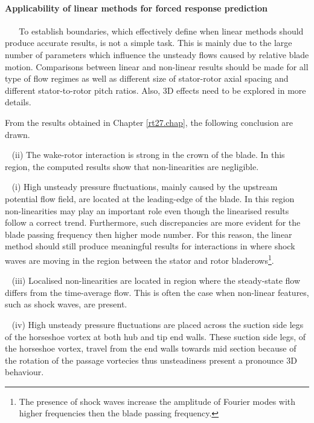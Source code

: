 \paragraph{Applicability of linear methods for forced response prediction}
 
~\newline
~\newline
 To establish boundaries, which effectively define
 when linear methods should produce accurate results, is not a simple task.
 This is mainly  due to the large number of parameters which influence the unsteady
 flows caused by relative blade motion.
 Comparisons between linear and non-linear results should be made for
 all type of flow regimes as well as different size of stator-rotor axial spacing
 and different stator-to-rotor pitch ratios. Also,
 3D effects need to be explored in more details.
 
 From the results obtained in Chapter \ref{rt27.chap}, the following conclusion
 are drawn.
 
~\newline
 (ii) The wake-rotor interaction is strong in the crown of the blade. In this region,
 the computed results show that non-linearities are negligible.

~\newline
 (i) High unsteady pressure fluctuations, mainly caused by the upstream potential flow field,
 are located at the leading-edge of the blade. In this region non-linearities may
 play an important role even though the linearised results follow a correct trend.
 Furthermore, such discrepancies are more evident for the blade passing frequency then
 higher mode number. For this reason, the linear method should still produce
 meaningful results for interactions in where shock waves are moving in the region
 between the stator and rotor bladerows\footnote{The presence of shock waves increase
 the amplitude of Fourier modes with higher frequencies then the blade passing frequency.}.

~\newline
 (iii) Localised non-linearities are located in region where the steady-state flow
 differs from the time-average flow. This is often the case when non-linear features,
 such as shock waves, are present.

~\newline
 (iv) High unsteady pressure fluctuations are placed across the suction side legs
 of the horseshoe vortex at both hub and tip end walls. These suction side legs,
 of the horseshoe vortex,
 travel from the end walls towards mid section because of the rotation of the
 passage vortecies thus unsteadiness present a pronounce 3D behaviour.
%
%
%
%
%
